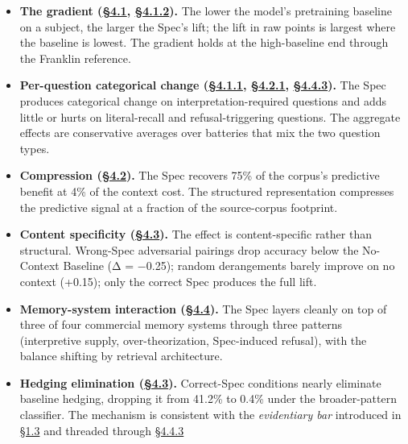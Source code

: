 \begin{itemize}
\tightlist
\item
  \textbf{The gradient (\hyperref[the-cross-subject-gradient-and-its-per-question-mechanism]{§4.1}, \hyperref[the-gradient-at-the-high-baseline-end-franklin-reference]{§4.1.2}).} The lower the model's
  pretraining baseline on a subject, the larger the Spec's lift; the
  lift in raw points is largest where the baseline is lowest. The
  gradient holds at the high-baseline end through the Franklin
  reference.
\item
  \textbf{Per-question categorical change (\hyperref[per-question-baseline-engagement-and-the-worked-rubric-example]{§4.1.1}, \hyperref[per-question-improvement-rate]{§4.2.1}, \hyperref[where-the-spec-helps-where-it-hurts-and-which-question-types-route-to-each]{§4.4.3}).} The
  Spec produces categorical change on interpretation-required questions
  and adds little or hurts on literal-recall and refusal-triggering
  questions. The aggregate effects are conservative averages over
  batteries that mix the two question types.
\item
  \textbf{Compression (\hyperref[compression-structure-vs.-raw-text]{§4.2}).} The Spec recovers 75\% of the corpus's
  predictive benefit at 4\% of the context cost. The structured
  representation compresses the predictive signal at a fraction of the
  source-corpus footprint.
\item
  \textbf{Content specificity (\hyperref[mechanism-correct-content-not-format]{§4.3}).} The effect is content-specific
  rather than structural. Wrong-Spec adversarial pairings drop accuracy
  below the No-Context Baseline (Δ = −0.25); random derangements barely
  improve on no context (+0.15); only the correct Spec produces the full
  lift.
\item
  \textbf{Memory-system interaction (\hyperref[memory-system-composition]{§4.4}).} The Spec layers cleanly on
  top of three of four commercial memory systems through three patterns
  (interpretive supply, over-theorization, Spec-induced refusal), with
  the balance shifting by retrieval architecture.
\item
  \textbf{Hedging elimination (\hyperref[mechanism-correct-content-not-format]{§4.3}).} Correct-Spec conditions nearly
  eliminate baseline hedging, dropping it from 41.2\% to 0.4\% under the
  broader-pattern classifier. The mechanism is consistent with the
  \emph{evidentiary bar} introduced in \hyperref[what-we-found]{§1.3} and threaded through \hyperref[where-the-spec-helps-where-it-hurts-and-which-question-types-route-to-each]{§4.4.3}

\end{itemize}
